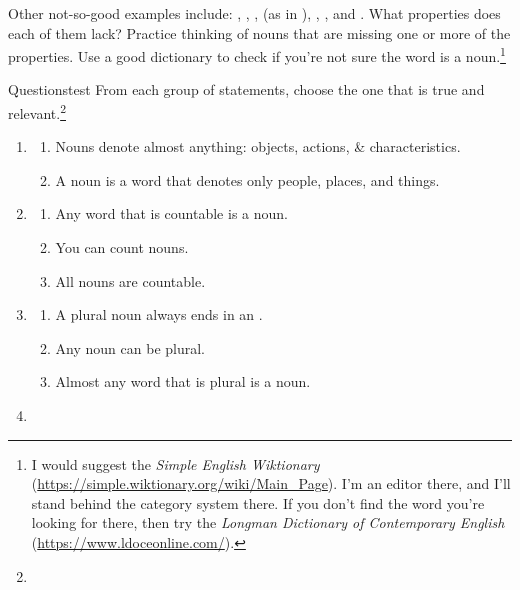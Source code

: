 Other not-so-good examples include: , , ,  (as in ), , , and . What properties does each of them lack? Practice thinking of nouns that are missing one or more of the properties. Use a good dictionary to check if you're not sure the word is a noun.\footnote{I would suggest the \textit{Simple English Wiktionary} (\url{https://simple.wiktionary.org/wiki/Main_Page}). I'm an editor there, and I'll stand behind the category system there. If you don't find the word you're looking for there, then try the \textit{Longman Dictionary of Contemporary English} (\url{https://www.ldoceonline.com/}).}


\begin{tblsframedsymbol}{Questions}{test}
From each group of statements, choose the one that is true and relevant.\footnote{
}
    \begin{enumerate}[noitemsep, leftmargin=*]
        \item\begin{enumerate}[noitemsep]
            \item Nouns denote almost anything: objects, actions, \& characteristics.
            \item A noun is a word that denotes only people, places, and things.
        \end{enumerate}
        \item\begin{enumerate}[noitemsep]
            \item Any word that is countable is a noun.
            \item You can count nouns.
            \item All nouns are countable.
        \end{enumerate}
        \item\begin{enumerate}[noitemsep]
            \item A plural noun always ends in an .
            \item Any noun can be plural.
            \item Almost any word that is plural is a noun.
        \end{enumerate}
        \item\begin{enumerate}[noitemsep]

\end{enumerate}
\end{enumerate}
\end{tblsframedsymbol}

